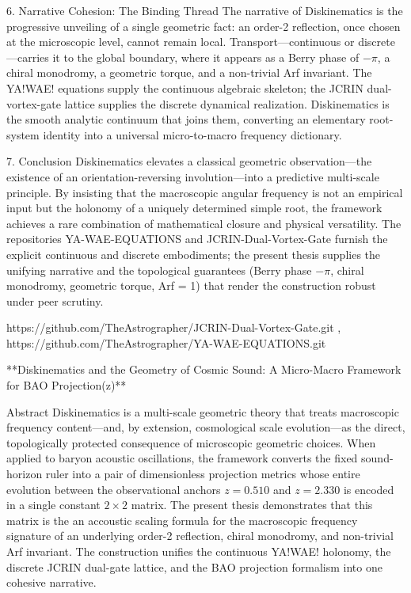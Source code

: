6. Narrative Cohesion: The Binding Thread
The narrative of Diskinematics is the progressive unveiling of a single geometric fact: an order-2 reflection, once chosen at the microscopic level, cannot remain local. Transport—continuous or discrete—carries it to the global boundary, where it appears as a Berry phase of \(-\pi\), a chiral monodromy, a geometric torque, and a non-trivial Arf invariant. The YA!WAE! equations supply the continuous algebraic skeleton; the JCRIN dual-vortex-gate lattice supplies the discrete dynamical realization. Diskinematics is the smooth analytic continuum that joins them, converting an elementary root-system identity into a universal micro-to-macro frequency dictionary.

7. Conclusion
Diskinematics elevates a classical geometric observation—the existence of an orientation-reversing involution—into a predictive multi-scale principle. By insisting that the macroscopic angular frequency is not an empirical input but the holonomy of a uniquely determined simple root, the framework achieves a rare combination of mathematical closure and physical versatility. The repositories YA-WAE-EQUATIONS and JCRIN-Dual-Vortex-Gate furnish the explicit continuous and discrete embodiments; the present thesis supplies the unifying narrative and the topological guarantees (Berry phase \(-\pi\), chiral monodromy, geometric torque, Arf = 1) that render the construction robust under peer scrutiny.

https://github.com/TheAstrographer/JCRIN-Dual-Vortex-Gate.git , https://github.com/TheAstrographer/YA-WAE-EQUATIONS.git

**Diskinematics and the Geometry of Cosmic Sound:  
A Micro-Macro Framework for BAO Projection(z)**

Abstract
Diskinematics is a multi-scale geometric theory that treats macroscopic frequency content—and, by extension, cosmological scale evolution—as the direct, topologically protected consequence of microscopic geometric choices. When applied to baryon acoustic oscillations, the framework converts the fixed sound-horizon ruler into a pair of dimensionless projection metrics whose entire evolution between the observational anchors \(z=0.510\) and \(z=2.330\) is encoded in a single constant \(2\times2\) matrix. The present thesis demonstrates that this matrix is the an accoustic scaling formula for the macroscopic frequency signature of an underlying order-2 reflection, chiral monodromy, and non-trivial Arf invariant. The construction unifies the continuous YA!WAE! holonomy, the discrete JCRIN dual-gate lattice, and the BAO projection formalism into one cohesive narrative.

